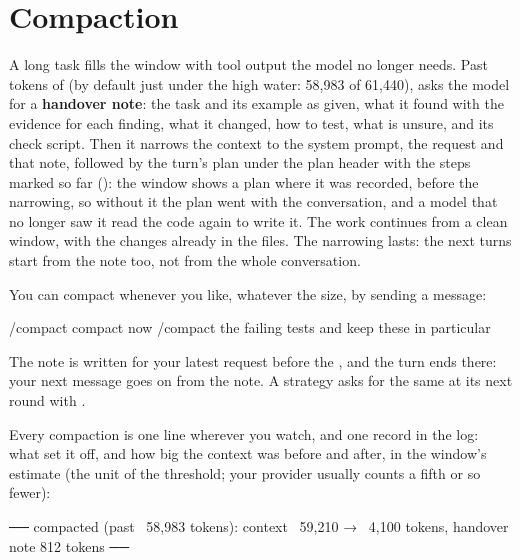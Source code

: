 \section{Compaction}

A long task fills the window with tool output the model no longer needs.
Past  tokens of  (by default
just under the high water: 58,983 of 61,440),  asks the model for a
\textbf{handover note}: the task and its example as given, what it found
with the evidence for each finding, what it changed, how to test, what is
unsure, and its check script. Then it narrows the context to the system
prompt, the request and that note, followed by the turn's plan under the
plan header with the steps marked so far (): the window
shows a plan where it was recorded, before the narrowing, so without it the
plan went with the conversation, and a model that no longer saw it read the
code again to write it. The work continues from a clean window, with the
changes already in the files. The narrowing lasts: the next turns start from
the note too, not from the whole conversation.

You can compact whenever you like, whatever the size, by sending a message:

\begin{txt}
/compact                     compact now
/compact the failing tests   and keep these in particular
\end{txt}

The note is written for your latest request before the ,
and the turn ends there: your next message goes on from the note. A
strategy asks for the same at its next round with
.

Every compaction is one line wherever you watch, and one
 record in the log: what set it off, and how big the
context was before and after, in the window's estimate (the unit of the
threshold; your provider usually counts a fifth or so fewer):

\begin{txt}
── compacted (past ~58,983 tokens): context ~59,210 → ~4,100 tokens, handover note 812 tokens ──
\end{txt}

